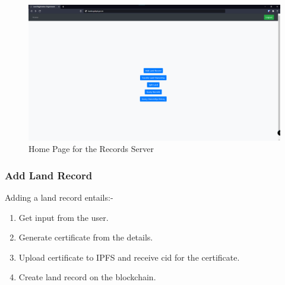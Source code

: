 \documentclass{article}
\begin{document}
        \begin{figure}[htbp]
            \includegraphics[scale=0.25]{records_home}
            \centering
            \caption{Home Page for the Records Server}
        \end{figure}
        
        

        \subsubsection{Add Land Record}
            Adding a land record entails:-
            \begin{enumerate}
                \item Get input from the user.
                \item Generate certificate from the details.
                \item Upload certificate to IPFS and receive \gls{cid} for the certificate.
                \item Create land record on the blockchain.
            \end{enumerate}
\end{document}
